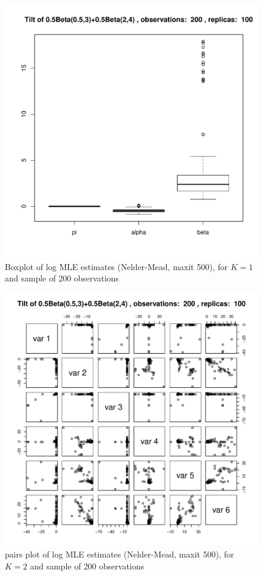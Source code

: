 \documentclass[10pt]{report}
\begin{document}
\begin{figure}[h]
\centering
\includegraphics[width=\textwidth]{../img/p05_a05_b3_p05_a2_b4/tilted/K1/bxplots/n200_R100.pdf}
\caption{Boxplot of log MLE estimates (Nelder-Mead, maxit 500), for $K=1$ and sample of 200 observations}
\label{fig:TBD6}
\end{figure}

\begin{figure}[h]
\centering
\includegraphics[width=\textwidth]{../img/p05_a05_b3_p05_a2_b4/tilted/K2/pairs/n200_R100.pdf}
\caption{pairs plot of log MLE estimates (Nelder-Mead, maxit 500), for $K=2$ and sample of 200 observations}
\label{fig:TBD7}
\end{figure}
\end{document}
